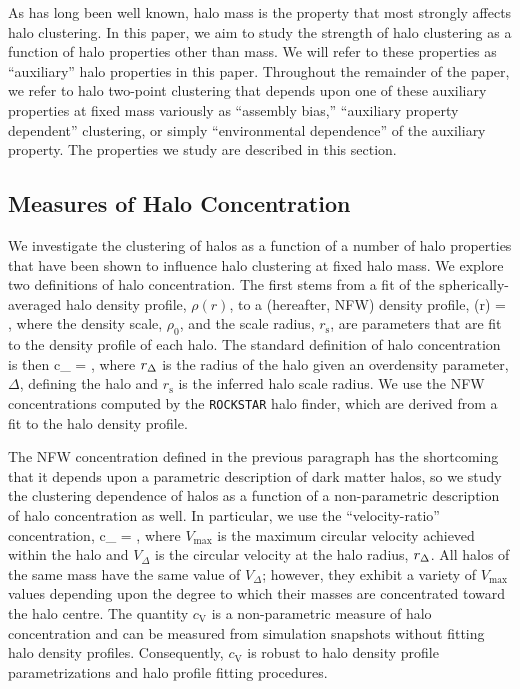 \documentclass[usenatbib,fleqn]{mnras}
\begin{document}
As has long been well known, halo mass is the property that most strongly affects halo clustering. In 
this paper, we aim to study the strength of halo clustering as a function of halo properties other than 
mass. We will refer to these properties as ``auxiliary'' halo properties in this paper. Throughout the remainder of the paper, we refer to halo two-point clustering that depends upon one of these auxiliary properties at fixed mass variously as ``assembly bias,'' ``auxiliary property dependent'' clustering, or simply ``environmental dependence'' of the auxiliary property. The properties 
we study are described in this section.

\subsection{Measures of Halo Concentration}

We investigate the clustering of halos as a function of a number of halo properties 
that have been shown to influence halo clustering at fixed halo mass. We explore 
two definitions of halo concentration. The first stems from a fit of the spherically-averaged 
halo density profile, $\rho(r)$, to a \citet{navarro_etal97} (hereafter, NFW) density profile, 
%
\beq
\rho(r) = ,
\eeq
%
where the density scale, $\rho_0$, and the scale radius, $r_{\mathrm{s}}$, are parameters 
that are fit to the density profile of each halo. The standard definition of halo concentration is then 
\beq
c_{} = ,
\eeq
where $r_{\Delta}$ is the radius of the halo given an overdensity parameter, $\Delta$, defining the halo 
and $r_{\mathrm{s}}$ is the inferred halo scale radius. We use the NFW concentrations computed by the 
{\tt ROCKSTAR} halo finder, which are derived from a fit to the halo density profile.  


The NFW concentration defined in the previous paragraph has the shortcoming that it 
depends upon a parametric description of dark matter halos, so we study the clustering dependence 
of halos as a function of a non-parametric description of halo concentration as well. In particular, we 
use the ``velocity-ratio'' concentration,
\beq
c_{} = , 
\eeq
where $V_{\mathrm{max}}$ is the maximum circular velocity achieved within the halo and $V_{\Delta}$ is 
the circular velocity at the halo radius, $r_{\Delta}$. All halos of the same mass have the same value of $V_{\Delta}$; however, 
they exhibit a variety of $V_{\mathrm{max}}$ values depending upon the degree to which their masses are concentrated toward 
the halo centre. The quantity $c_{\mathrm{V}}$ is a non-parametric measure of halo concentration and can be measured from 
simulation snapshots without fitting halo density profiles. Consequently, $c_{\mathrm{V}}$ is robust to halo density 
profile parametrizations and halo profile fitting procedures. 
\end{document}
